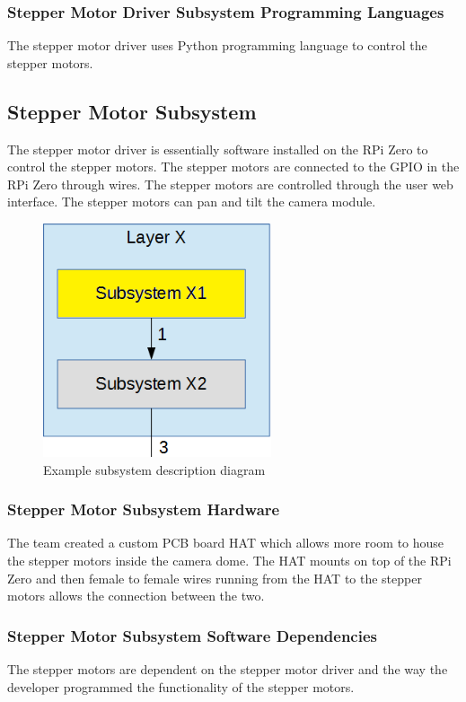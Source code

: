 \subsubsection{Stepper Motor Driver Subsystem Programming Languages}
The stepper motor driver uses Python programming language to control the stepper motors.



\subsection{Stepper Motor Subsystem}
The stepper motor driver is essentially software installed on the RPi Zero to control the stepper motors. The stepper motors are connected to the GPIO in the RPi Zero through wires. The stepper motors are controlled through the user web interface. The stepper motors can pan and tilt the camera module. 


\begin{figure}[h!]
	\centering
 	\includegraphics[width=0.60\textwidth]{images/subsystem}
 \caption{Example subsystem description diagram}
\end{figure}

\subsubsection{Stepper Motor Subsystem Hardware}
The team created a custom PCB board HAT which allows more room to house the stepper motors inside the camera dome. The HAT mounts on top of the RPi Zero and then female to female wires running from the HAT to the stepper motors allows the connection between the two.


\subsubsection{Stepper Motor Subsystem Software Dependencies}
The stepper motors are dependent on the stepper motor driver and the way the developer programmed the functionality of the stepper motors.



